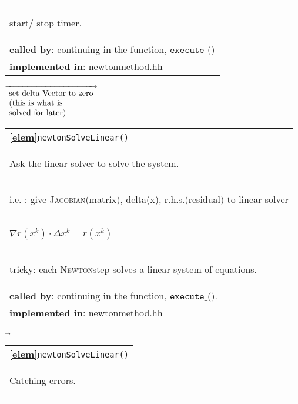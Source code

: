 \begin{landscape}
{\begin{tabular}{|l|}
      \begin{scriptsize}start/ stop timer.\end{scriptsize}\\
      \textbf{called by}: continuing in the function, $\texttt{execute\_()}$ \\ 
      \textbf{implemented in}: newtonmethod.hh\\ 
	\hline 
  \end{tabular}
    {\scriptsize$\overrightarrow
				  {\begin{array}{l}
				  \textnormal{set delta Vector to zero} \\
				  \textnormal{(this is what is}\\
				  \textnormal{solved for later)}\\
                                \end{array}}
    $}
   \begin{tabular}{|l|} 
      \hline 
      \textbf{\textcircled{\ref{elem}}}\verb?newtonSolveLinear()  ?\\ 
      \begin{scriptsize}Ask the linear solver to solve the system.\end{scriptsize}\\
      \begin{scriptsize}i.e. : give \textsc{Jacobian}(matrix), delta(x), r.h.s.(residual) to linear solver\end{scriptsize}\\
      \begin{scriptsize}$\nabla r(x^k) \cdot \Delta x^k = r(x^k)$\end{scriptsize}\\
      \begin{scriptsize}tricky: each \textsc{Newton}step solves a linear system of equations. \end{scriptsize}\\
      \textbf{called by}: continuing in the function, $\texttt{execute\_()}$. \\ 
      \textbf{implemented in}: newtonmethod.hh\\ 
	\hline 
  \end{tabular}
\nextline
    {\scriptsize$\overrightarrow{}
    $}
   \begin{tabular}{|l|} 
      \hline 
      \textbf{\textcircled{\ref{elem}}}\verb+newtonSolveLinear()+\\ 
      \begin{scriptsize}Catching errors.\end{scriptsize}\\

\end{tabular}}
\end{landscape}
